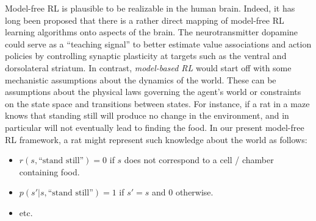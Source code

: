 \documentclass[10pt,letterpaper]{article}
\begin{document}
Model-free RL is plausible to be realizable in the human brain. Indeed,
it has long been proposed \citep{dayan2008decision} that there
is a rather direct mapping of model-free RL learning algorithms
onto aspects of the brain.
The neurotransmitter dopamine could serve
as a ``teaching signal'' to better estimate value associations
and action policies by controlling
synaptic plasticity at targets such as the ventral and
dorsolateral striatum.
In contrast, \textit{model-based RL} would start off with some mechanistic assumptions about the dynamics of the world.
These can be assumptions about the physical laws governing the agent's world or constraints on the state space and transitions between states.
For instance, if a rat in a maze knows
that standing still will produce no change in the environment, and in particular will not eventually lead to finding the food.
In our present model-free RL framework,
a rat might represent such knowledge about the world as follows:
\begin{itemize}
\item $r(s, \text{``stand still''}) = 0$ if $s$ does not correspond to a cell / chamber containing food.
\item $p(s'|s,\text{``stand still''}) = 1$ if $s'=s$ and $0$ otherwise.
\item etc.
\end{itemize}
\end{document}
